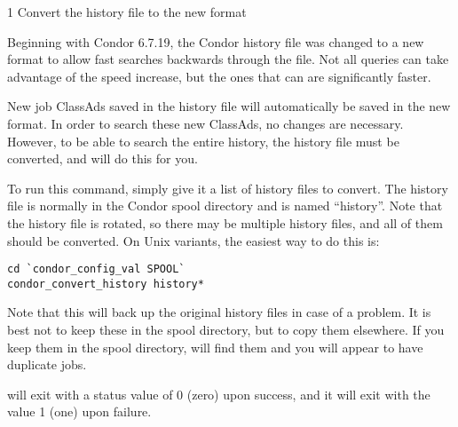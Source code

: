 \begin{ManPage}{\label{man-condor-convert-history}}{1}
{Convert the history file to the new format}
\Synopsis 



\Description

Beginning with Condor 6.7.19, the Condor history file was changed to a
new format to allow fast searches backwards through the file. Not all
queries can take advantage of the speed increase, but the ones that
can are significantly faster. 

New job ClassAds saved in the history file will automatically be saved
in the new format. In order to search these new ClassAds, no changes
are necessary. However, to be able to search the entire history, the
history file must be converted, and  will do
this for you. 

To run this command, simply give it a list of history files to
convert. The history file is normally in the Condor spool directory
and is named ``history''. Note that the history file is rotated, so
there may be multiple history files, and all of them should be
converted. On Unix variants, the easiest way to do this is:

\begin{verbatim}
cd `condor_config_val SPOOL`
condor_convert_history history*
\end{verbatim}

Note that this will back up the original history files in case of a
problem. It is best not to keep these in the spool directory, but to
copy them elsewhere. If you keep them in the spool directory,
 will find them and you will appear to have duplicate
jobs. 

\ExitStatus

 will exit with a status value of 0 (zero)
upon success, and it will exit with the value 1 (one) upon failure.

\end{ManPage}

